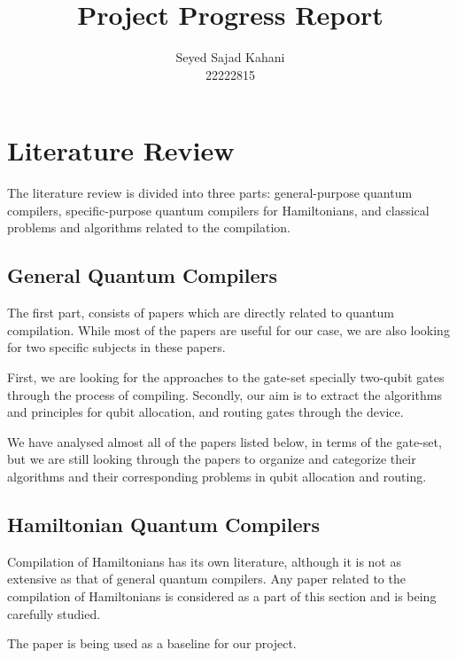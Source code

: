 \documentclass{article}
\title{Project Progress Report}
\author{Seyed Sajad Kahani \\ 22222815}
\begin{document}
\maketitle

\nocite{*}

\section{Literature Review}

The literature review is divided into three parts: general-purpose quantum compilers, specific-purpose quantum compilers for Hamiltonians, and classical problems and algorithms related to the compilation.

\subsection{General Quantum Compilers}

The first part, consists of papers which are directly related to quantum compilation. While most of the papers are useful for our case, we are also looking for two specific subjects in these papers.

First, we are looking for the approaches to the gate-set specially two-qubit gates through the process of compiling.
Secondly, our aim is to extract the algorithms and principles for qubit allocation, and routing gates through the device.

We have analysed almost all of the papers listed below, in terms of the gate-set, but we are still looking through the papers to organize and categorize their algorithms and their corresponding problems in qubit allocation and routing.

\printbibliography[heading=none,keyword=general]

\subsection{Hamiltonian Quantum Compilers}

Compilation of Hamiltonians has its own literature, although it is not as extensive as that of general quantum compilers. Any paper related to the compilation of Hamiltonians is considered as a part of this section and is being carefully studied.

The paper \cite{lao2021} is being used as a baseline for our project.

\printbibliography[heading=none,keyword=hamiltonian]
\end{document}
